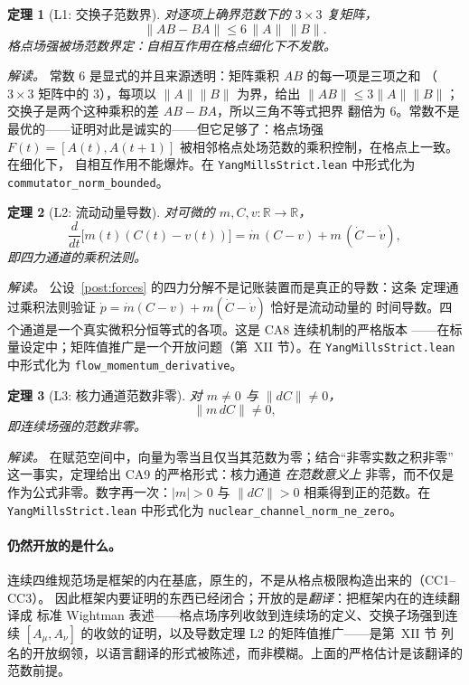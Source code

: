 \documentclass[aps,prd,preprint,superscriptaddress,amsmath,amssymb]{revtex4-2}
\newtheorem{theorem}{定理}[section]
\begin{document}
\begin{theorem}[L1: 交换子范数界]
\label{thm:l1}
对逐项上确界范数下的 $3\times3$ 复矩阵，
\begin{equation}
\|AB-BA\| \le 6\,\|A\|\,\|B\| .
\end{equation}
格点场强被场范数界定：自相互作用在格点细化下不发散。
\end{theorem}

\emph{解读。} 常数 $6$ 是显式的并且来源透明：矩阵乘积 $AB$ 的每一项是三项之和
（$3\times3$ 矩阵中的 $3$），每项以 $\|A\|\|B\|$ 为界，给出
$\|AB\|\le 3\|A\|\|B\|$；交换子是两个这种乘积的差 $AB-BA$，所以三角不等式把界
翻倍为 $6$。常数不是最优的——证明对此是诚实的——但它足够了：格点场强
$F(t)=[A(t),A(t{+}1)]$ 被相邻格点处场范数的乘积控制，在格点上一致。在细化下，
自相互作用不能爆炸。在 \texttt{YangMillsStrict.lean} 中形式化为
\texttt{commutator\_norm\_bounded}。

\begin{theorem}[L2: 流动动量导数]
\label{thm:l2}
对可微的 $m,C,v:\mathbb{R}\to\mathbb{R}$，
\begin{equation}
\frac{d}{dt}\bigl[m(t)(C(t)-v(t))\bigr]
= \dot m\,(C-v) + m\,(\dot C-\dot v),
\end{equation}
即四力通道的乘积法则。
\end{theorem}

\emph{解读。} 公设~\ref{post:forces} 的四力分解不是记账装置而是真正的导数：这条
定理通过乘积法则验证 $\dot p=\dot m(C-v)+m(\dot C-\dot v)$ 恰好是流动动量的
时间导数。四个通道是一个真实微积分恒等式的各项。这是 CA8 连续机制的严格版本
——在标量设定中；矩阵值推广是一个开放问题（第~XII 节）。在
\texttt{YangMillsStrict.lean} 中形式化为 \texttt{flow\_momentum\_derivative}。

\begin{theorem}[L3: 核力通道范数非零]
\label{thm:l3}
对 $m\neq0$ 与 $\|dC\|\neq0$，
\begin{equation}
\|m\,dC\|\neq0,
\end{equation}
即连续场强的范数非零。
\end{theorem}

\emph{解读。} 在赋范空间中，向量为零当且仅当其范数为零；结合``非零实数之积非零''
这一事实，定理给出 CA9 的严格形式：核力通道 \emph{在范数意义上} 非零，而不仅是
作为公式非零。数字再一次：$|m|>0$ 与 $\|dC\|>0$ 相乘得到正的范数。在
\texttt{YangMillsStrict.lean} 中形式化为
\texttt{nuclear\_channel\_}\allowbreak\texttt{norm\_ne\_zero}。

\paragraph{仍然开放的是什么。}
连续四维规范场是框架的内在基底，原生的，不是从格点极限构造出来的（CC1--CC3）。
因此框架内要证明的东西已经闭合；开放的是\emph{翻译}：把框架内在的连续翻译成
标准 Wightman 表述——格点场序列收敛到连续场的定义、交换子场强到连续
$[A_\mu,A_\nu]$ 的收敛的证明，以及导数定理 L2 的矩阵值推广——是第~XII 节
列名的开放纲领，以语言翻译的形式被陈述，而非模糊。上面的严格估计是该翻译的
范数前提。
\end{document}
